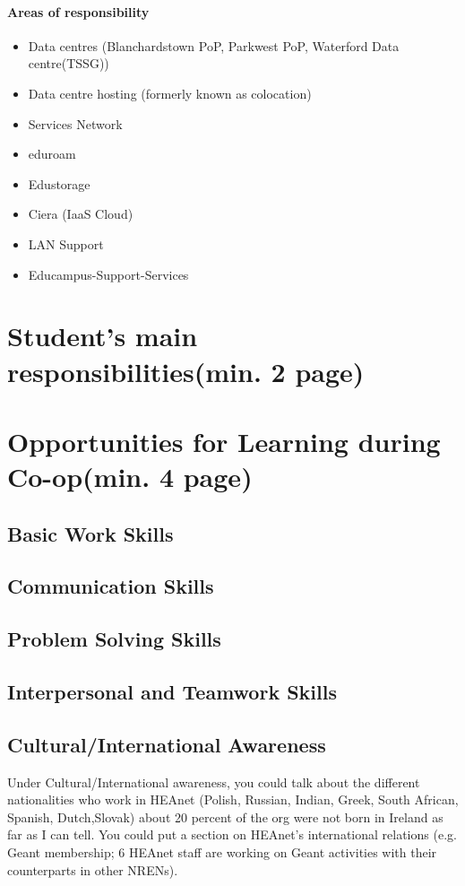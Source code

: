 \documentclass{article}
\begin{document}
\paragraph{Areas of responsibility}
\begin{itemize}
	\item Data centres (Blanchardstown PoP, Parkwest PoP, Waterford Data centre(TSSG))
	\item Data centre hosting (formerly known as colocation)
	\item Services Network
	\item eduroam
	\item Edustorage
	\item Ciera (IaaS Cloud)
	\item LAN Support
	\item Educampus-Support-Services
\end{itemize}


\newpage

\section{Student's main responsibilities(min. 2 page)}

\newpage

\section{Opportunities for Learning during Co-op(min. 4 page)}
\subsection{Basic Work Skills}

\subsection{Communication Skills}
\subsection{Problem Solving Skills}
\subsection{Interpersonal and Teamwork Skills}
\subsection{Cultural/International Awareness}
Under Cultural/International awareness, you could talk about the different nationalities who work in HEAnet (Polish, Russian, Indian, Greek, South African, Spanish, Dutch,Slovak) about 20 percent of the org were not born in Ireland as far as I can tell. You could put a section on HEAnet's international relations (e.g. Geant membership;  6 HEAnet staff are working on Geant activities with their counterparts in other NRENs).
\end{document}

